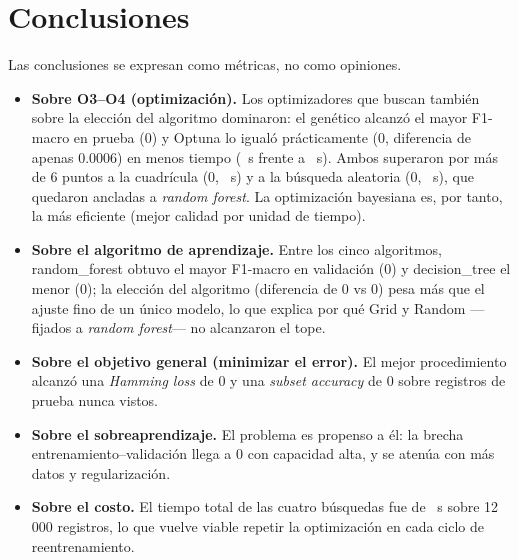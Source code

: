 \documentclass[11pt,a4paper,twocolumn]{article}
\providecommand{\Searchsub}{12\,000}\providecommand{\CVfolds}{3}
\providecommand{\GridFtest}{0}\providecommand{\GridGap}{0}\providecommand{\GridHam}{0}\providecommand{\GridSubset}{0}
\providecommand{\RandFtest}{0}\providecommand{\RandGap}{0}\providecommand{\RandHam}{0}\providecommand{\RandSubset}{0}
\providecommand{\OptunaFtest}{0}\providecommand{\OptunaGap}{0}\providecommand{\OptunaHam}{0}\providecommand{\OptunaSubset}{0}
\providecommand{\GenFtest}{0}\providecommand{\GenGap}{0}\providecommand{\GenHam}{0}\providecommand{\GenSubset}{0}
\providecommand{\BestAlgo}{random\_forest}\providecommand{\BestAlgoF}{0}\providecommand{\WorstAlgo}{decision\_tree}\providecommand{\WorstAlgoF}{0}
\providecommand{\LCgap}{0}\providecommand{\LCtrainEnd}{0}\providecommand{\LCcvEnd}{0}\providecommand{\LCcvStart}{0}\providecommand{\PCAneff}{16}
\begin{document}
\section{Conclusiones}
Las conclusiones se expresan como métricas, no como opiniones.
\begin{itemize}[leftmargin=1.1em,itemsep=2pt]
\item \textbf{Sobre O3--O4 (optimización).} Los optimizadores que buscan también sobre la elección del
algoritmo dominaron: el genético alcanzó el mayor F1-macro en prueba (\GenFtest{}) y Optuna lo igualó
prácticamente (\OptunaFtest{}, diferencia de apenas 0.0006) en menos tiempo (\OptunaTime{}~s frente a
\GenTime{}~s). Ambos superaron por más de 6 puntos a la cuadrícula (\GridFtest{}, \GridTime{}~s) y a la
búsqueda aleatoria (\RandFtest{}, \RandTime{}~s), que quedaron ancladas a \textit{random forest}. La
optimización bayesiana es, por tanto, la más eficiente (mejor calidad por unidad de tiempo).
\item \textbf{Sobre el algoritmo de aprendizaje.} Entre los cinco algoritmos, \BestAlgo{} obtuvo el mayor
F1-macro en validación (\BestAlgoF{}) y \WorstAlgo{} el menor (\WorstAlgoF{}); la elección del algoritmo
(diferencia de \BestAlgoF{} vs \WorstAlgoF{}) pesa más que el ajuste fino de un único modelo, lo que explica
por qué Grid y Random ---fijados a \textit{random forest}--- no alcanzaron el tope.
\item \textbf{Sobre el objetivo general (minimizar el error).} El mejor procedimiento alcanzó una
\textit{Hamming loss} de \OptunaHam{} y una \textit{subset accuracy} de \OptunaSubset{} sobre \Ntest{}
registros de prueba nunca vistos.
\item \textbf{Sobre el sobreaprendizaje.} El problema es propenso a él: la brecha entrenamiento--validación
llega a \LCgap{} con capacidad alta, y se atenúa con más datos y regularización.
\item \textbf{Sobre el costo.} El tiempo total de las cuatro búsquedas fue de \TotalRuntime{}~s sobre
\Searchsub{} registros, lo que vuelve viable repetir la optimización en cada ciclo de reentrenamiento.
\end{itemize}

\end{document}

